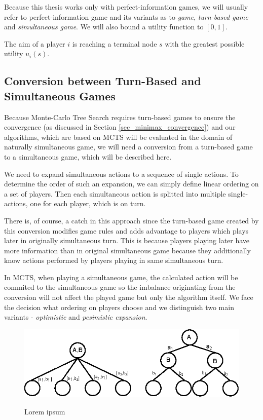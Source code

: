 Because this thesis works only with perfect-information games, we will usually refer to
perfect-information game and its variants as to \emph{game}, \emph{turn-based game} and
\emph{simultaneous game}. We will also bound a utility function to $[0,1]$.

The aim of a player $i$ is reaching a terminal node $s$ with the greatest possible utility
$u_i(s)$.

\subsection{Conversion between Turn-Based and Simultaneous Games}
\label{sec_turn_based_game_conversion}

Because Monte-Carlo Tree Search requires turn-based games to ensure the convergence (as discussed in
Section \ref{sec_minimax_convergence}) and our
algorithms, which are based on MCTS will be evaluated in the domain of naturally simultaneous game,
we will need a conversion from a turn-based game to a simultaneous game, which will be described
here.

We need to expand simultaneous actions to a sequence of single actions. To determine the order of such
an expansion, we can simply define linear ordering on a set of players. Then each simultaneous
action 
is splitted into multiple single-actions, one for each player, which is on turn.

There is, of course, a catch in this approach since the turn-based game created by this conversion
modifies game rules and adds advantage to players which plays later in originally simultaneous turn.
This is because players playing later have more information than in original simultaneous game
because they additionally know actions performed by players playing in same simultaneous turn.

In MCTS, when playing a simultaneous game, the calculated action will be commited to the simultaneous
game so the imbalance originating from the conversion will not affect the played game but only the
algorithm itself. We face the decision what ordering on players choose and we distinguish two main
variants - \emph{optimistic} and \emph{pesimistic expansion}. 

\begin{figure}
\begin{center}
\includegraphics[width=12cm]{img/simultaneous_node_expansion.eps}
\end{center}
\caption{\footnotesize Lorem ipsum}{\footnotesize }
\label{fig_simultaneous_node_expansion}
\end{figure}

